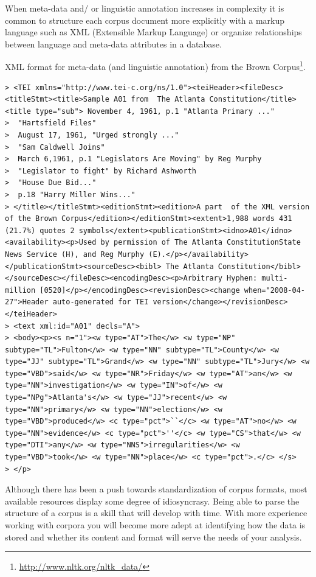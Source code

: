 \documentclass[
]{article}
\DeclareRobustCommand{\href}[2]{#2\footnote{\url{#1}}}
\begin{document}
When meta-data and/ or linguistic annotation increases in complexity it is common to structure each corpus document more explicitly with a markup language such as XML (Extensible Markup Language) or organize relationships between language and meta-data attributes in a database.

XML format for meta-data (and linguistic annotation) from the \href{http://www.nltk.org/nltk_data/}{Brown Corpus}.

\begin{verbatim}
> <TEI xmlns="http://www.tei-c.org/ns/1.0"><teiHeader><fileDesc><titleStmt><title>Sample A01 from  The Atlanta Constitution</title><title type="sub"> November 4, 1961, p.1 "Atlanta Primary ..."
>  "Hartsfield Files"
>  August 17, 1961, "Urged strongly ..."
>  "Sam Caldwell Joins"
>  March 6,1961, p.1 "Legislators Are Moving" by Reg Murphy
>  "Legislator to fight" by Richard Ashworth
>  "House Due Bid..."
>  p.18 "Harry Miller Wins..."
> </title></titleStmt><editionStmt><edition>A part  of the XML version of the Brown Corpus</edition></editionStmt><extent>1,988 words 431 (21.7%) quotes 2 symbols</extent><publicationStmt><idno>A01</idno><availability><p>Used by permission of The Atlanta ConstitutionState News Service (H), and Reg Murphy (E).</p></availability></publicationStmt><sourceDesc><bibl> The Atlanta Constitution</bibl></sourceDesc></fileDesc><encodingDesc><p>Arbitrary Hyphen: multi-million [0520]</p></encodingDesc><revisionDesc><change when="2008-04-27">Header auto-generated for TEI version</change></revisionDesc></teiHeader>
> <text xml:id="A01" decls="A">
> <body><p><s n="1"><w type="AT">The</w> <w type="NP" subtype="TL">Fulton</w> <w type="NN" subtype="TL">County</w> <w type="JJ" subtype="TL">Grand</w> <w type="NN" subtype="TL">Jury</w> <w type="VBD">said</w> <w type="NR">Friday</w> <w type="AT">an</w> <w type="NN">investigation</w> <w type="IN">of</w> <w type="NPg">Atlanta's</w> <w type="JJ">recent</w> <w type="NN">primary</w> <w type="NN">election</w> <w type="VBD">produced</w> <c type="pct">``</c> <w type="AT">no</w> <w type="NN">evidence</w> <c type="pct">''</c> <w type="CS">that</w> <w type="DTI">any</w> <w type="NNS">irregularities</w> <w type="VBD">took</w> <w type="NN">place</w> <c type="pct">.</c> </s>
> </p>
\end{verbatim}

Although there has been a push towards standardization of corpus formats, most available resources display some degree of idiosyncrasy. Being able to parse the structure of a corpus is a skill that will develop with time. With more experience working with corpora you will become more adept at identifying how the data is stored and whether its content and format will serve the needs of your analysis.
\end{document}
